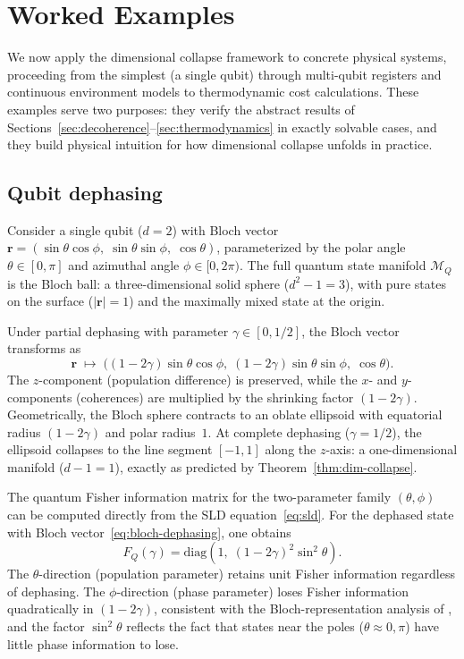 \documentclass[12pt,a4paper]{article}
\theoremstyle{definition}
\theoremstyle{remark}
\begin{document}
\section{Worked Examples}
\label{sec:examples}

We now apply the dimensional collapse framework to concrete physical systems, proceeding from the simplest (a single qubit) through multi-qubit registers and continuous environment models to thermodynamic cost calculations.  These examples serve two purposes: they verify the abstract results of Sections~\ref{sec:decoherence}--\ref{sec:thermodynamics} in exactly solvable cases, and they build physical intuition for how dimensional collapse unfolds in practice.

\subsection{Qubit dephasing}
\label{sec:qubit-dephasing}

Consider a single qubit ($d = 2$) with Bloch vector $\mathbf{r} = (\sin\theta\cos\phi,\; \sin\theta\sin\phi,\; \cos\theta)$, parameterized by the polar angle $\theta \in [0,\pi]$ and azimuthal angle $\phi \in [0,2\pi)$.  The full quantum state manifold $\mathcal{M}_Q$ is the Bloch ball: a three-dimensional solid sphere ($d^2 - 1 = 3$), with pure states on the surface ($|\mathbf{r}| = 1$) and the maximally mixed state at the origin.

Under partial dephasing with parameter $\gamma \in [0, 1/2]$, the Bloch vector transforms as
\begin{equation}
\label{eq:bloch-dephasing}
\mathbf{r} \;\mapsto\; \bigl((1-2\gamma)\sin\theta\cos\phi,\; (1-2\gamma)\sin\theta\sin\phi,\; \cos\theta\bigr).
\end{equation}
The $z$-component (population difference) is preserved, while the $x$- and $y$-components (coherences) are multiplied by the shrinking factor $(1-2\gamma)$.  Geometrically, the Bloch sphere contracts to an oblate ellipsoid with equatorial radius $(1-2\gamma)$ and polar radius~$1$.  At complete dephasing ($\gamma = 1/2$), the ellipsoid collapses to the line segment $[-1,1]$ along the $z$-axis: a one-dimensional manifold ($d - 1 = 1$), exactly as predicted by Theorem~\ref{thm:dim-collapse}.

The quantum Fisher information matrix for the two-parameter family $(\theta, \phi)$ can be computed directly from the SLD equation~\eqref{eq:sld}.  For the dephased state with Bloch vector~\eqref{eq:bloch-dephasing}, one obtains
\begin{equation}
\label{eq:qfim-qubit}
F_Q(\gamma) = \mathrm{diag}\!\left(1,\; (1-2\gamma)^2 \sin^2\theta\right).
\end{equation}
The $\theta$-direction (population parameter) retains unit Fisher information regardless of dephasing.  The $\phi$-direction (phase parameter) loses Fisher information quadratically in $(1-2\gamma)$, consistent with the Bloch-representation analysis of \cite{lu2013fisher}, and the factor $\sin^2\theta$ reflects the fact that states near the poles ($\theta \approx 0, \pi$) have little phase information to lose.
\end{document}

